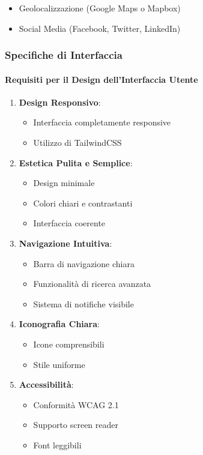 \begin{itemize}
    \item Geolocalizzazione (Google Maps o Mapbox)
    \item Social Media (Facebook, Twitter, LinkedIn)
\end{itemize}

\subsubsection{Specifiche di Interfaccia}

\paragraph{Requisiti per il Design dell'Interfaccia Utente}

\begin{enumerate}
    \item \textbf{Design Responsivo}:
    \begin{itemize}
        \item Interfaccia completamente responsive
        \item Utilizzo di TailwindCSS
    \end{itemize}
    
    \item \textbf{Estetica Pulita e Semplice}:
    \begin{itemize}
        \item Design minimale
        \item Colori chiari e contrastanti
        \item Interfaccia coerente
    \end{itemize}
    
    \item \textbf{Navigazione Intuitiva}:
    \begin{itemize}
        \item Barra di navigazione chiara
        \item Funzionalità di ricerca avanzata
        \item Sistema di notifiche visibile
    \end{itemize}
    
    \item \textbf{Iconografia Chiara}:
    \begin{itemize}
        \item Icone comprensibili
        \item Stile uniforme
    \end{itemize}
    
    \item \textbf{Accessibilità}:
    \begin{itemize}
        \item Conformità WCAG 2.1
        \item Supporto screen reader
        \item Font leggibili
    \end{itemize}
\end{enumerate}

